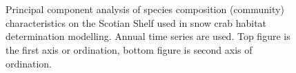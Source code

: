 \documentclass[11pt]{article}
\newcommand{\D}{.}
\newcommand{\h}{C:/} %
\newcommand{\es}{bio.data/bio.snowcrab/} %
\newcommand{\ea}{bio.data/aegis/}
\begin{document}
\begin{figure}
  \centering  
  	\\
	\
	\caption{Principal component analysis of species composition (community) characteristics on the Scotian Shelf used in snow crab habitat determination modelling. Annual time series are used. Top figure is the first axis or ordination, bottom figure is second axis of ordination.}
\end{figure}
\clearpage



\end{document}
